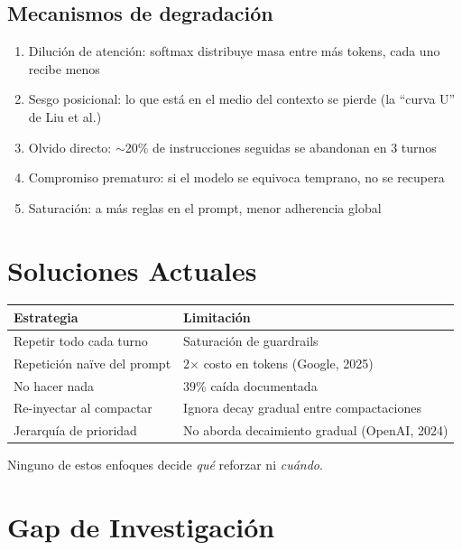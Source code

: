 \documentclass[11pt]{article}
\begin{document}
\subsection{Mecanismos de degradaci\'on}

\begin{enumerate}
    \item Diluci\'on de atenci\'on: softmax distribuye masa entre m\'as tokens, cada uno recibe menos
    \item Sesgo posicional: lo que est\'a en el medio del contexto se pierde (la ``curva U'' de Liu et al.)
    \item Olvido directo: $\sim$20\% de instrucciones seguidas se abandonan en 3 turnos
    \item Compromiso prematuro: si el modelo se equivoca temprano, no se recupera
    \item Saturaci\'on: a m\'as reglas en el prompt, menor adherencia global
\end{enumerate}

\section{Soluciones Actuales}

{\centering
\begin{tabular}{@{} l l @{}}
\toprule
\textbf{Estrategia} & \textbf{Limitaci\'on} \\
\midrule
Repetir todo cada turno & Saturaci\'on de guardrails \\
Repetici\'on na\"ive del prompt & 2$\times$ costo en tokens (Google, 2025) \\
No hacer nada & 39\% ca\'ida documentada \\
Re-inyectar al compactar & Ignora decay gradual entre compactaciones \\
Jerarqu\'ia de prioridad & No aborda decaimiento gradual (OpenAI, 2024) \\
\bottomrule
\end{tabular}\par}

Ninguno de estos enfoques decide \emph{qu\'e} reforzar ni \emph{cu\'ando}.

\section{Gap de Investigaci\'on}
\end{document}
